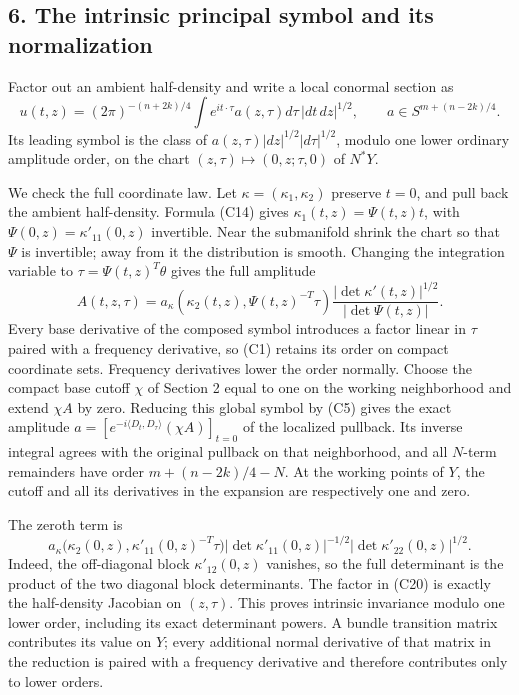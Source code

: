 \documentclass[
  11pt,
]{article}
\begin{document}
\subsection{6. The intrinsic principal symbol and its
normalization}\label{the-intrinsic-principal-symbol-and-its-normalization}

Factor out an ambient half-density and write a local conormal section as
\[
u(t,z)=(2\pi)^{-(n+2k)/4}
\int e^{it\cdot\tau}a(z,\tau)d\tau\,|dt\,dz|^{1/2},
\qquad a\in S^{m+(n-2k)/4}.
\tag{C18}
\] Its leading symbol is the class of
\(a(z,\tau)|dz|^{1/2}|d\tau|^{1/2}\), modulo one lower ordinary
amplitude order, on the chart \((z,\tau)\mapsto(0,z;\tau,0)\) of
\(N^*Y\).

We check the full coordinate law. Let \(\kappa=(\kappa_1,\kappa_2)\)
preserve \(t=0\), and pull back the ambient half-density. Formula (C14)
gives \(\kappa_1(t,z)=\Psi(t,z)t\), with \(\Psi(0,z)=\kappa'_{11}(0,z)\)
invertible. Near the submanifold shrink the chart so that \(\Psi\) is
invertible; away from it the distribution is smooth. Changing the
integration variable to \(\tau=\Psi(t,z)^T\theta\) gives the full
amplitude \[
A(t,z,\tau)=a_\kappa(\kappa_2(t,z),\Psi(t,z)^{-T}\tau)
\frac{|\det\kappa'(t,z)|^{1/2}}{|\det\Psi(t,z)|}.
\tag{C19}
\] Every base derivative of the composed symbol introduces a factor
linear in \(\tau\) paired with a frequency derivative, so (C1) retains
its order on compact coordinate sets. Frequency derivatives lower the
order normally. Choose the compact base cutoff \(\chi\) of Section 2
equal to one on the working neighborhood and extend \(\chi A\) by zero.
Reducing this global symbol by (C5) gives the exact amplitude
\(a=[e^{-i\langle D_t,D_\tau\rangle}(\chi A)]_{t=0}\) of the localized
pullback. Its inverse integral agrees with the original pullback on that
neighborhood, and all \(N\)-term remainders have order \(m+(n-2k)/4-N\).
At the working points of \(Y\), the cutoff and all its derivatives in
the expansion are respectively one and zero.

The zeroth term is \[
a_\kappa\big(\kappa_2(0,z),\kappa'_{11}(0,z)^{-T}\tau\big)
|\det\kappa'_{11}(0,z)|^{-1/2}
|\det\kappa'_{22}(0,z)|^{1/2}.
\tag{C20}
\] Indeed, the off-diagonal block \(\kappa'_{12}(0,z)\) vanishes, so the
full determinant is the product of the two diagonal block determinants.
The factor in (C20) is exactly the half-density Jacobian on
\((z,\tau)\). This proves intrinsic invariance modulo one lower order,
including its exact determinant powers. A bundle transition matrix
contributes its value on \(Y\); every additional normal derivative of
that matrix in the reduction is paired with a frequency derivative and
therefore contributes only to lower orders.
\end{document}
